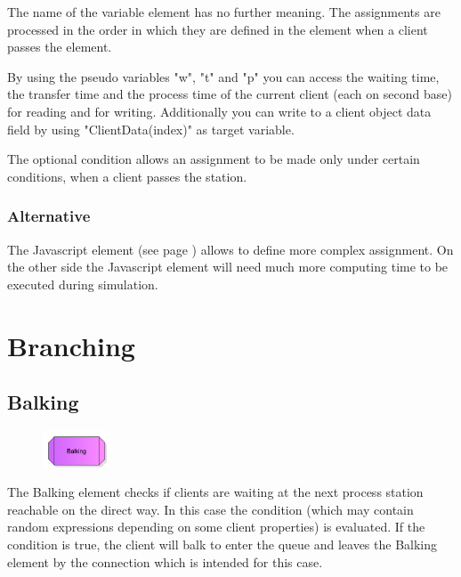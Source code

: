 The name of the variable element has no further meaning.
The assignments are processed in the order in which they are defined in the element when a client passes the element.

By using the pseudo variables "w", "t" and "p" you can access the waiting time, the transfer time and the
process time of the current client (each on second base) for reading and for writing. Additionally you can
write to a client object data field by using "ClientData(index)" as target variable.

The optional condition allows an assignment to be made only under certain conditions,
when a client passes the station.

\subsection*{Alternative}

The Javascript element (see page \pageref{ref:ModelElementSetJS}) allows to define more complex assignment.
On the other side the Javascript element will need much more computing time to be executed during simulation.





\chapter{Branching}

\section{Balking}
\label{ref:ModelElementBalking}

\begin{figure}
\vspace{-22pt}
\includegraphics[width=2cm]{imageModelElementBalking.png}
\vspace{-22pt}
\end{figure}

The Balking element checks if clients are waiting at the next process station reachable
on the direct way. In this case the condition (which may contain random expressions depending
on some client properties) is evaluated. If the condition is true, the client will balk to
enter the queue and leaves the Balking element by the connection which is intended for this
case.

